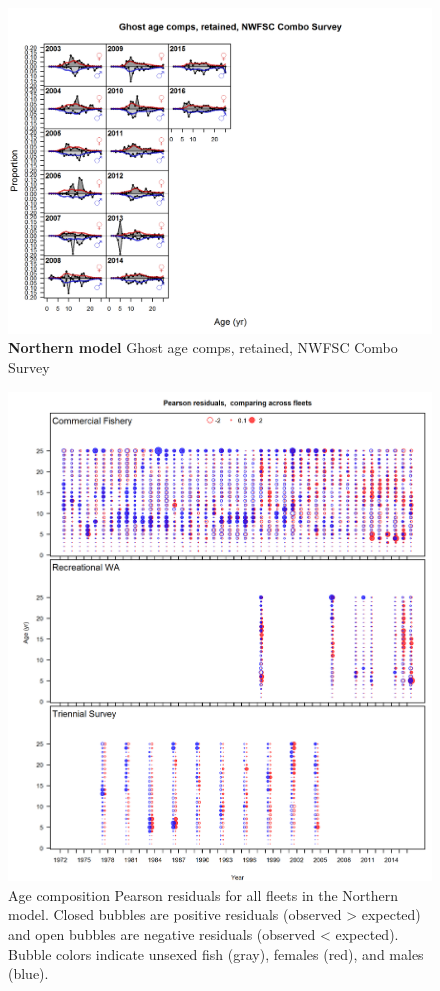 \documentclass[12pt,]{article}
\begin{document}
\begin{figure}[htbp]
\centering
\includegraphics{./r4ss/plots_mod1/comp_gstagefit_flt6mkt2.png}
\caption{\textbf{Northern model} Ghost age comps, retained, NWFSC Combo
Survey \label{fig:mod1_16_comp_gstagefit_flt6mkt2}}
\end{figure}

\FloatBarrier

\newpage

\begin{figure}[htbp]
\centering
\includegraphics{r4ss/plots_mod1/comp_agefit__multi-fleet_comparison.png}
\caption{Age composition Pearson residuals for all fleets in the
Northern model. Closed bubbles are positive residuals (observed
\textgreater{} expected) and open bubbles are negative residuals
(observed \textless{} expected). Bubble colors indicate unsexed fish
(gray), females (red), and males
(blue).\label{fig:comp_Pearson_age_mod1}}
\end{figure}
\end{document}
